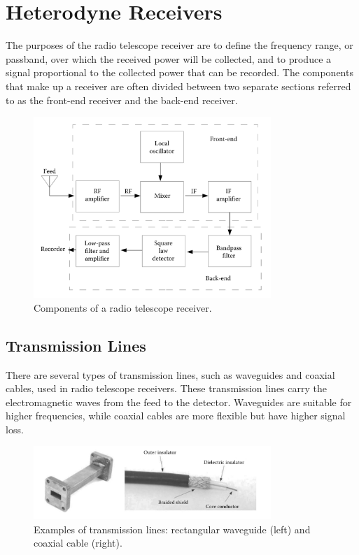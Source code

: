 \section{Heterodyne Receivers}

The purposes of the radio telescope receiver are to define the frequency range, or passband, over which the received power will be collected, and to produce a signal proportional to the collected power that can be recorded. The components that make up a receiver are often divided between two separate sections referred to as the front-end receiver and the back-end receiver.

\begin{figure}[H]
	\centering
	\includegraphics[width=0.8\textwidth]{Images/telescope_components.png}
	\caption{Components of a radio telescope receiver.}
	\label{fig:telescope_components}
\end{figure}

\subsection{Transmission Lines}

There are several types of transmission lines, such as waveguides and coaxial cables, used in radio telescope receivers. These transmission lines carry the electromagnetic waves from the feed to the detector. Waveguides are suitable for higher frequencies, while coaxial cables are more flexible but have higher signal loss.

\begin{figure}[H]
    \centering
    \includegraphics[width=0.8\textwidth]{Images/waveguide_coaxial.png}
    \caption{Examples of transmission lines: rectangular waveguide (left) and coaxial cable (right).}
    \label{fig:transmission_lines}
\end{figure}

